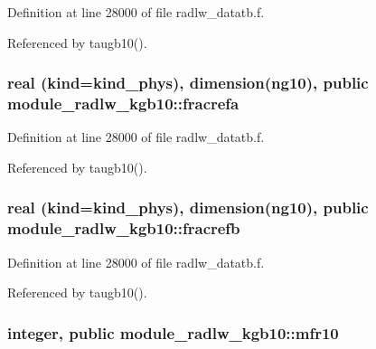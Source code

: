 Definition at line 28000 of file radlw\+\_\+datatb.\+f.



Referenced by taugb10().

\subsubsection[{\texorpdfstring{fracrefa}{fracrefa}}]{\setlength{\rightskip}{0pt plus 5cm}real (kind=kind\+\_\+phys), dimension(ng10), public module\+\_\+radlw\+\_\+kgb10\+::fracrefa}\hypertarget{namespacemodule__radlw__kgb10_aa8bbfdaf370e12ae26d2ee3c464bdbc2}{}\label{namespacemodule__radlw__kgb10_aa8bbfdaf370e12ae26d2ee3c464bdbc2}


Definition at line 28000 of file radlw\+\_\+datatb.\+f.



Referenced by taugb10().

\subsubsection[{\texorpdfstring{fracrefb}{fracrefb}}]{\setlength{\rightskip}{0pt plus 5cm}real (kind=kind\+\_\+phys), dimension(ng10), public module\+\_\+radlw\+\_\+kgb10\+::fracrefb}\hypertarget{namespacemodule__radlw__kgb10_a07d5bac00d30f1ab873a0542b28d7e83}{}\label{namespacemodule__radlw__kgb10_a07d5bac00d30f1ab873a0542b28d7e83}


Definition at line 28000 of file radlw\+\_\+datatb.\+f.



Referenced by taugb10().

\subsubsection[{\texorpdfstring{mfr10}{mfr10}}]{\setlength{\rightskip}{0pt plus 5cm}integer, public module\+\_\+radlw\+\_\+kgb10\+::mfr10}\hypertarget{namespacemodule__radlw__kgb10_a0f3944c4b86044e0c5db3dc351226c88}{}\label{namespacemodule__radlw__kgb10_a0f3944c4b86044e0c5db3dc351226c88}



